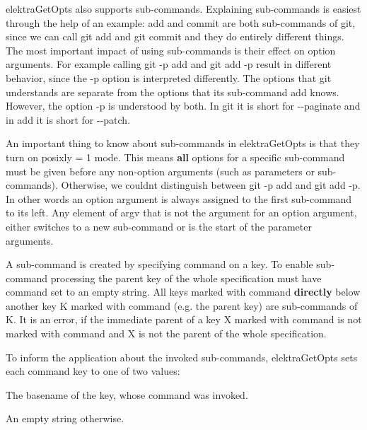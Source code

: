 {\ttfamily elektra\+Get\+Opts} also supports sub-\/commands. Explaining sub-\/commands is easiest through the help of an example\+: {\ttfamily add} and {\ttfamily commit} are both sub-\/commands of {\ttfamily git}, since we can call {\ttfamily git add} and {\ttfamily git commit} and they do entirely different things. The most important impact of using sub-\/commands is their effect on option arguments. For example calling {\ttfamily git -\/p add} and {\ttfamily git add -\/p} result in different behavior, since the {\ttfamily -\/p} option is interpreted differently. The options that {\ttfamily git} understands are separate from the options that its sub-\/command {\ttfamily add} knows. However, the option {\ttfamily -\/p} is understood by both. In {\ttfamily git} it is short for {\ttfamily -\/-\/paginate} and in {\ttfamily add} it is short for {\ttfamily -\/-\/patch}.

An important thing to know about sub-\/commands in {\ttfamily elektra\+Get\+Opts} is that they turn on {\ttfamily posixly = 1} mode. This means {\bfseries all} options for a specific sub-\/command must be given before any non-\/option arguments (such as parameters or sub-\/commands). Otherwise, we couldn\textquotesingle{}t distinguish between {\ttfamily git -\/p add} and {\ttfamily git add -\/p}. In other words an option argument is always assigned to the first sub-\/command to its left. Any element of {\ttfamily argv} that is not the argument for an option argument, either switches to a new sub-\/command or is the start of the parameter arguments.

A sub-\/command is created by specifying {\ttfamily command} on a key. To enable sub-\/command processing the parent key of the whole specification must have {\ttfamily command} set to an empty string. All keys marked with {\ttfamily command} {\bfseries directly} below another key {\ttfamily K} marked with {\ttfamily command} (e.\+g. the parent key) are sub-\/commands of {\ttfamily K}. It is an error, if the immediate parent of a key {\ttfamily X} marked with {\ttfamily command} is not marked with {\ttfamily command} and {\ttfamily X} is not the parent of the whole specification.

To inform the application about the invoked sub-\/commands, {\ttfamily elektra\+Get\+Opts} sets each {\ttfamily command} key to one of two values\+:


\begin{DoxyItemize}
\item The basename of the key, whose command was invoked.
\item An empty string otherwise.
\end{DoxyItemize}

